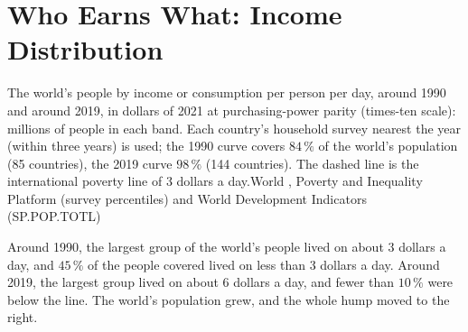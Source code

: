 \chapter{Who Earns What: Income Distribution}\label{ch:g9:income-distribution}

\begin{openingchart}{The world's people by income or consumption per person per day, around 1990 and around
2019, in dollars of 2021 at purchasing-power parity (times-ten scale): millions of people in each band. Each
country's household survey nearest the year (within three years) is used; the 1990 curve covers
$84\,\%$ of the world's population (85 countries), the 2019 curve $98\,\%$ (144 countries). The dashed line is
the international poverty line of 3 dollars a day.}{World , Poverty and Inequality Platform (survey
percentiles) and World Development Indicators (SP.POP.TOTL)}
\end{openingchart}

Around 1990, the largest group of the world's people lived on about 3 dollars a day, and $45\,\%$ of the
people covered lived on less than 3 dollars a day. Around 2019, the largest group lived on about 6 dollars
a day, and fewer than $10\,\%$ were below the line. The world's population grew, and the whole hump moved
to the right.

